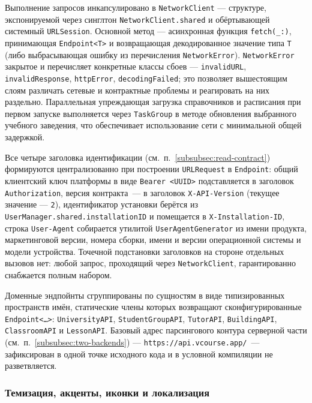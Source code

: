 Выполнение запросов инкапсулировано в \texttt{NetworkClient} --- структуре, экспонируемой через синглтон \texttt{NetworkClient.shared} и обёртывающей системный \texttt{URLSession}. Основной метод --- асинхронная функция \texttt{fetch(\_:)}, принимающая \texttt{Endpoint<T>} и возвращающая декодированное значение типа \texttt{T} (либо выбрасывающая ошибку из перечисления \texttt{NetworkError}). \texttt{NetworkError} закрытое и перечисляет конкретные классы сбоев --- \texttt{invalidURL}, \texttt{invalidResponse}, \texttt{httpError}, \texttt{decodingFailed}; это позволяет вышестоящим слоям различать сетевые и контрактные проблемы и реагировать на них раздельно. Параллельная упреждающая загрузка справочников и расписания при первом запуске выполняется через \texttt{TaskGroup} в методе обновления выбранного учебного заведения, что обеспечивает использование сети с минимальной общей задержкой.

Все четыре заголовка идентификации (см.~п.~\ref{subsubsec:read-contract}) формируются централизованно при построении \texttt{URLRequest} в \texttt{Endpoint}: общий клиентский ключ платформы в виде \texttt{Bearer <UUID>} подставляется в заголовок \texttt{Authorization}, версия контракта~--- в заголовок \texttt{X-API-Version} (текущее значение --- \texttt{2}), идентификатор установки берётся из \texttt{UserManager.\allowbreak shared.\allowbreak installationID} и помещается в \texttt{X-Installation-ID}, строка \texttt{User-Agent} собирается утилитой \texttt{UserAgentGenerator} из имени продукта, маркетинговой версии, номера сборки, имени и версии операционной системы и модели устройства. Точечной подстановки заголовков на стороне отдельных вызовов нет: любой запрос, проходящий через \texttt{NetworkClient}, гарантированно снабжается полным набором.

Доменные эндпойнты сгруппированы по сущностям в виде типизированных пространств имён, статические члены которых возвращают сконфигурированные \texttt{Endpoint<\dots>}: \texttt{UniversityAPI}, \texttt{StudentGroupAPI}, \texttt{TutorAPI}, \texttt{BuildingAPI}, \texttt{ClassroomAPI} и \texttt{LessonAPI}. Базовый адрес парсингового контура серверной части (см.~п.~\ref{subsubsec:two-backends}) --- \texttt{https://api.vcourse.app/}~--- зафиксирован в одной точке исходного кода и в условной компиляции не разветвляется.

\subsubsection{Темизация, акценты, иконки и локализация}
\label{subsubsec:impl-ios-ui}

